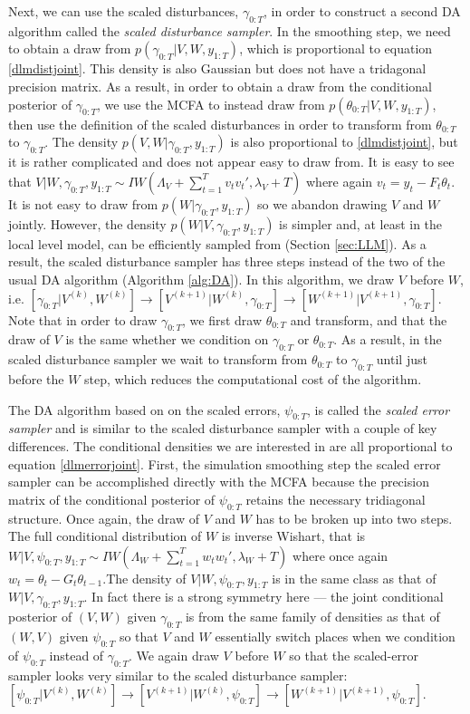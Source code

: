\documentclass{article}
\begin{document}
Next, we can use the scaled disturbances, $\gamma_{0:T}$, in order to construct a second DA algorithm called the {\it scaled disturbance sampler}. In the smoothing step, we need to obtain a draw from $p(\gamma_{0:T}|V,W,y_{1:T})$, which is proportional to equation \eqref{dlmdistjoint}. This density is also Gaussian but does not have a tridagonal precision matrix. As a result, in order to obtain a draw from the conditional posterior of $\gamma_{0:T}$, we use the MCFA to instead draw from $p(\theta_{0:T}|V,W,y_{1:T})$, then use the definition of the scaled disturbances in order to transform from $\theta_{0:T}$ to $\gamma_{0:T}$. The density $p(V,W|\gamma_{0:T},y_{1:T})$ is also proportional to \eqref{dlmdistjoint}, but it is rather complicated and does not appear easy to draw from. It is easy to see that $V|W,\gamma_{0:T},y_{1:T} \sim IW\left(\Lambda_V + \sum_{t=1}^Tv_tv_t',\lambda_V + T\right)$ where again $v_t = y_t - F_t\theta_t$. It is not easy to draw from $p(W|\gamma_{0:T},y_{1:T})$ so we abandon drawing $V$ and $W$ jointly. However, the density $p(W|V,\gamma_{0:T},y_{1:T})$ is simpler and, at least in the local level model, can be efficiently sampled from (Section \ref{sec:LLM}). As a result, the scaled disturbance sampler has three steps instead of the two of the usual DA algorithm (Algorithm \ref{alg:DA}). In this algorithm, we draw $V$ before $W$, i.e. $[\gamma_{0:T}|V^{(k)},W^{(k)}] \to [V^{(k+1)}|W^{(k)},\gamma_{0:T}] \to [W^{(k+1)}|V^{(k+1)},\gamma_{0:T}]$. Note that in order to draw $\gamma_{0:T}$, we first draw $\theta_{0:T}$ and transform, and that the draw of $V$ is the same whether we condition on $\gamma_{0:T}$ or $\theta_{0:T}$. As a result, in the scaled disturbance sampler we wait to transform from $\theta_{0:T}$ to $\gamma_{0:T}$ until just before the $W$ step, which reduces the computational cost of the algorithm.

The DA algorithm based on on the scaled errors, $\psi_{0:T}$, is called the {\it scaled error sampler} and is similar to the scaled disturbance sampler with a couple of key differences. The conditional densities we are interested in are all proportional to equation \eqref{dlmerrorjoint}. First, the simulation smoothing step the scaled error sampler can be accomplished directly with the MCFA because the precision matrix of the conditional posterior of $\psi_{0:T}$ retains the necessary tridiagonal structure. Once again, the draw of $V$ and $W$ has to be broken up into two steps. The full conditional distribution of $W$ is inverse Wishart, that is $W|V,\psi_{0:T},y_{1:T} \sim IW\left(\Lambda_W + \sum_{t=1}^Tw_tw_t',\lambda_{W} + T\right)$ where once again $w_t = \theta_t - G_t\theta_{t-1}$.The density of $V|W,\psi_{0:T},y_{1:T}$ is in the same class as that of $W|V,\gamma_{0:T},y_{1:T}$. In fact there is a strong symmetry here --- the joint conditional posterior of $(V,W)$ given $\gamma_{0:T}$ is from the same family of densities as that of $(W,V)$ given $\psi_{0:T}$ so that $V$ and $W$ essentially switch places when we condition of $\psi_{0:T}$ instead of $\gamma_{0:T}$. We again draw $V$ before $W$ so that the scaled-error sampler looks very similar to the scaled disturbance sampler: $[\psi_{0:T}|V^{(k)},W^{(k)}] \to [V^{(k+1)}|W^{(k)},\psi_{0:T}] \to [W^{(k+1)}|V^{(k+1)},\psi_{0:T}]$.
\end{document}

